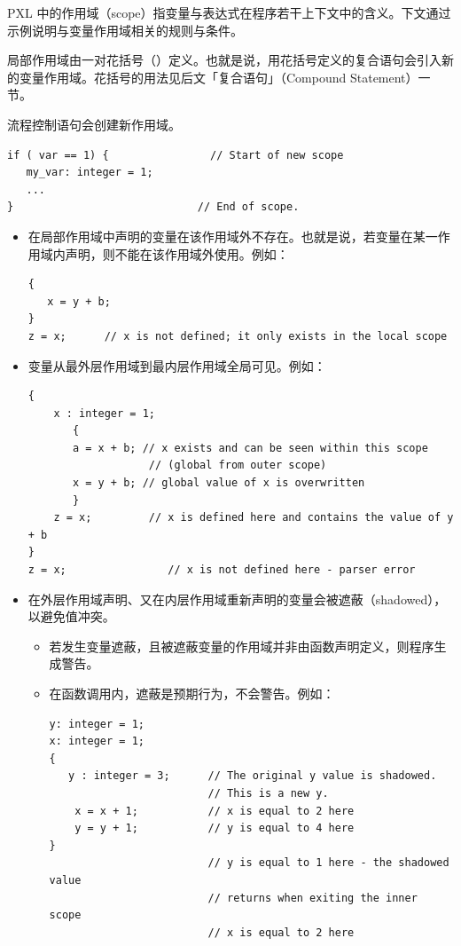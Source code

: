 PXL 中的作用域（scope）指变量与表达式在程序若干上下文中的含义。下文通过示例说明与变量作用域相关的规则与条件。

局部作用域由一对花括号（\cmd{\{\}}）定义。也就是说，用花括号定义的复合语句会引入新的变量作用域。花括号的用法见后文「复合语句」（Compound Statement）一节。

流程控制语句会创建新作用域。
\begin{lstlisting}[style=pxl]
if ( var == 1) {                // Start of new scope
   my_var: integer = 1;
   ...
}                             // End of scope.
\end{lstlisting}

\begin{itemize}
  \item 在局部作用域中声明的变量在该作用域外不存在。也就是说，若变量在某一作用域内声明，则不能在该作用域外使用。例如：
\begin{lstlisting}[style=pxl]
{
   x = y + b;
}
z = x;      // x is not defined; it only exists in the local scope
\end{lstlisting}
  \item 变量从最外层作用域到最内层作用域全局可见。例如：
\begin{lstlisting}[style=pxl]
{
    x : integer = 1;
       {
       a = x + b; // x exists and can be seen within this scope
                   // (global from outer scope)
       x = y + b; // global value of x is overwritten
       }
    z = x;         // x is defined here and contains the value of y + b
}
z = x;                // x is not defined here - parser error
\end{lstlisting}
  \item 在外层作用域声明、又在内层作用域重新声明的变量会被遮蔽（shadowed），以避免值冲突。
  \begin{itemize}
    \item 若发生变量遮蔽，且被遮蔽变量的作用域并非由函数声明定义，则程序生成警告。
    \item 在函数调用内，遮蔽是预期行为，不会警告。例如：
\begin{lstlisting}[style=pxl]
y: integer = 1;
x: integer = 1;
{
   y : integer = 3;      // The original y value is shadowed.
                         // This is a new y.
    x = x + 1;           // x is equal to 2 here
    y = y + 1;           // y is equal to 4 here
}
                         // y is equal to 1 here - the shadowed value
                         // returns when exiting the inner scope
                         // x is equal to 2 here
\end{lstlisting}
  \end{itemize}
\end{itemize}


